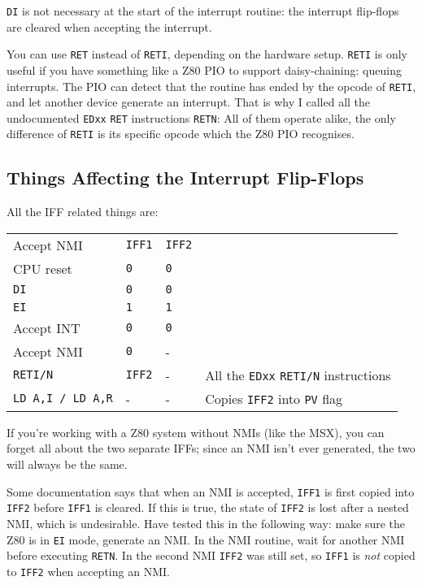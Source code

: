 {\tt DI} is not necessary at the start of the interrupt routine: the interrupt flip-flops are cleared when accepting the interrupt.

You can use {\tt RET} instead of {\tt RETI}, depending on the hardware setup. {\tt RETI} is only useful if you have something like a Z80 PIO to support daisy-chaining: queuing interrupts. The PIO can detect that the routine has ended by the opcode of {\tt RETI}, and let another device generate an interrupt. That is why I called all the undocumented {\tt EDxx} {\tt RET} instructions {\tt RETN}: All of them operate alike, the only difference of {\tt RETI} is its specific opcode which the Z80 PIO recognises.


\subsection{Things Affecting the Interrupt Flip-Flops}
\label{flipflop}

All the IFF related things are:

\begin{tabular}{llll}
	Accept NMI	& {\tt IFF1}	& {\tt IFF2} \\
	CPU reset	& {\tt 0}		& {\tt 0}\\
	{\tt DI}	& {\tt 0}		& {\tt 0}\\
	{\tt EI}	& {\tt 1}		& {\tt 1}\\
	Accept INT	& {\tt 0}		& {\tt 0}\\
	Accept NMI	& {\tt 0}		& -\\
	{\tt RETI/N}& {\tt IFF2}	& - & All the {\tt EDxx} {\tt RETI/N} instructions\\
	{\tt LD A,I / LD A,R} & - & - & Copies {\tt IFF2} into {\tt PV} flag
\end{tabular}

If you're working with a Z80 system without NMIs (like the MSX), you can forget all about the two separate IFFs; since an NMI isn't ever generated, the two will always be the same. 

Some documentation says that when an NMI is accepted, {\tt IFF1} is first copied into {\tt IFF2} before {\tt IFF1} is cleared. If this is true, the state of {\tt IFF2} is lost after a nested NMI, which is undesirable. Have tested this in the following way: make sure the Z80 is in {\tt EI} mode, generate an NMI. In the NMI routine, wait for another NMI before executing {\tt RETN}. In the second NMI {\tt IFF2} was still set, so {\tt IFF1} is {\em not} copied to {\tt IFF2} when accepting an NMI.

